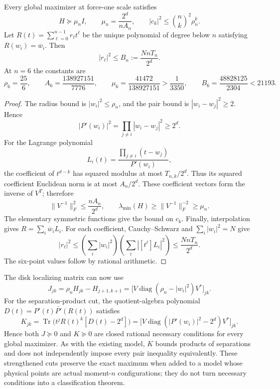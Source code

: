 \begin{proposition}\label{prop:trace-new}
Every global maximizer at force-one scale satisfies
\begin{equation}\label{eq:trace-new}
 H\succeq\mu_n I,\qquad
 \mu_n=\frac{2^d}{nA_n},\qquad
 |c_k|^2\le\binom nk^2\rho_n^k.
\end{equation}
Let $R(t)=\sum_{\ell=0}^{n-1}r_\ell t^\ell$ be the unique polynomial
of degree below $n$ satisfying $R(w_i)=\overline w_i$. Then
\begin{equation}\label{eq:conjugation-coeff-new}
 |r_\ell|^2\le B_n:=\frac{NnT_n}{2^d}.
\end{equation}
At $n=6$ the constants are
\[
 \rho_6=\frac{25}6,\qquad A_6=\frac{138927151}{7776},\qquad
 \mu_6=\frac{41472}{138927151}>\frac1{3350},\qquad
 B_6=\frac{48828125}{2304}<21193.
\]
\end{proposition}
\begin{proof}
The radius bound is $|w_i|^2\le\rho_n$, and the pair bound is
$|w_i-w_j|^2\ge2$. Hence
\[
 |P'(w_i)|^2=\prod_{j\ne i}|w_i-w_j|^2\ge2^d.
\]
For the Lagrange polynomial
\[
 L_i(t)=\frac{\prod_{j\ne i}(t-w_j)}{P'(w_i)},
\]
the coefficient of $t^{d-k}$ has squared modulus at most
$T_{n,k}/2^d$. Thus its squared coefficient Euclidean norm is at most
$A_n/2^d$. These coefficient vectors form the inverse of $V^T$;
therefore
\[
 \|V^{-1}\|_F^2\le\frac{nA_n}{2^d},\qquad
 \lambda_{\min}(H)\ge\|V^{-1}\|_F^{-2}\ge\mu_n.
\]
The elementary symmetric functions give the bound on $c_k$.
Finally, interpolation gives $R=\sum_i\overline w_i L_i$.
For each coefficient, Cauchy--Schwarz and $\sum_i|w_i|^2=N$ give
\[
 |r_\ell|^2\le
 \left(\sum_i|w_i|^2\right)
 \left(\sum_i|[t^\ell]L_i|^2\right)
 \le\frac{NnT_n}{2^d}.
\]
The six-point values follow by rational arithmetic.
\end{proof}

The disk localizing matrix can now use
\[
 J_{jk}=\rho_n H_{jk}-H_{j+1,k+1}
       =\bigl[V\operatorname{diag}(\rho_n-|w_i|^2)V^*\bigr]_{jk}.
\]
For the separation-product cut, the quotient-algebra polynomial
$D(t)=P'(t)\overline{P'}(R(t))$ satisfies
\[
 K_{jk}=\operatorname{Tr}\bigl(t^jR(t)^k[D(t)-2^d]\bigr)
       =\bigl[V\operatorname{diag}(|P'(w_i)|^2-2^d)V^*\bigr]_{jk}.
\]
Hence both $J\succeq0$ and $K\succeq0$ are closed rational necessary
conditions for every global maximizer. As with the existing model,
$K$ bounds products of separations and does not independently impose
every pair inequality equivalently. These strengthened cuts preserve
the exact maximum when added to a model whose physical points are
actual moment-$n$ configurations; they do not turn necessary conditions
into a classification theorem.
